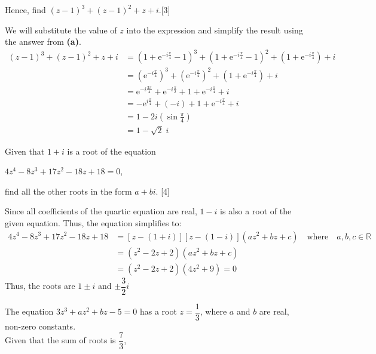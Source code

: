 \documentclass[12pt, a4 paper]{article}
\begin{document}
\begin{outline}[enumerate]
	\2 Hence, find $(z-1)^3+(z-1)^2+z+i$.\hfill[3]
	\begin{answer}
		We will substitute the value of $z$ into the expression and simplify the result using the answer from \textbf{(a)}.
		\begin{align*}
			(z-1)^3+(z-1)^2+z+i & = (1+\mathrm{e}^{-i\frac{\pi}{4}} - 1)^3 + (1+\mathrm{e}^{-i\frac{\pi}{4}} - 1)^2 + (1+\mathrm{e}^{-i\frac{\pi}{4}}) + i \\
			                    & = (\mathrm{e}^{-i\frac{\pi}{4}})^3 + (\mathrm{e}^{-i\frac{\pi}{4}})^2 + (1+\mathrm{e}^{-i\frac{\pi}{4}}) + i             \\
			                    & = \mathrm{e}^{-i\frac{3\pi}{4}} + \mathrm{e}^{-i\frac{\pi}{2}} + 1+\mathrm{e}^{-i\frac{\pi}{4}} + i                      \\
			                    & = -\mathrm{e}^{i\frac{\pi}{4}} + (-i) + 1+\mathrm{e}^{-i\frac{\pi}{4}} + i                                               \\
			                    & = 1 - 2i(\sin{\frac{\pi}{4}})                                                                                            \\
			                    & = 1-\sqrt{2}\;i
		\end{align*}
	\end{answer}
	\1 Given that $1+i$ is a root of the equation\begin{center}$4z^4-8z^3+17z^2-18z+18=0$,\end{center}find all the other roots in the form $a+bi$. \hfill[4] %
	\begin{answer}
		Since all coefficients of the quartic equation are real, $1-i$ is also a root of the given equation. Thus, the equation simplifies to:
		\begin{align*}
			4z^4-8z^3+17z^2-18z+18 & =[z-(1+i)][z-(1-i)](az^2+bz+c) \quad\textrm{where}\quad a,b,c\in\mathbb{R} \\
			                       & = (z^2-2z+2)(az^2+bz+c)                                                    \\
			                       & = (z^2-2z+2)(4z^2+9) = 0
		\end{align*}
		Thus, the roots are $1\pm i$ and $\pm\dfrac{3}{2}i$
	\end{answer}

	\1 The equation $3z^3+az^2+bz-5=0$ has a root $z=\dfrac{1}{3}$, where $a$ and $b$ are real, non-zero constants.\\Given that the sum of roots is $\dfrac{7}{3}$, %


\end{outline}
\end{document}
